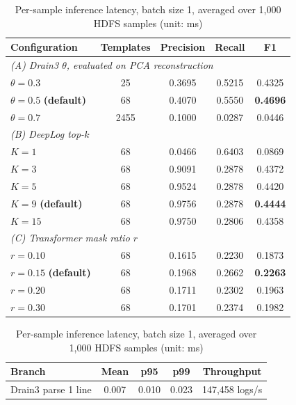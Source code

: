 \documentclass[conference]{IEEEtran}
\begin{document}
\begin{table}[!t]
\begin{minipage}[t]{0.48\textwidth}
\centering
\caption{Hyperparameter ablation study on HDFS 200k (seed 42)}
\label{tab_ablation}
\scriptsize
\setlength{\tabcolsep}{3pt}
\begin{tabular}{lcccc}
\toprule
\textbf{Configuration} & \textbf{Templates} & \textbf{Precision} & \textbf{Recall} & \textbf{F1} \\
\midrule
\multicolumn{5}{l}{\textit{(A) Drain3 $\theta$, evaluated on PCA reconstruction}} \\
$\theta=0.3$ & 25 & 0.3695 & 0.5215 & 0.4325 \\
$\theta=0.5$ \textbf{(default)} & 68 & 0.4070 & 0.5550 & \textbf{0.4696} \\
$\theta=0.7$ & 2455 & 0.1000 & 0.0287 & 0.0446 \\
\midrule
\multicolumn{5}{l}{\textit{(B) DeepLog top-$k$}} \\
$K=1$ & 68 & 0.0466 & 0.6403 & 0.0869 \\
$K=3$ & 68 & 0.9091 & 0.2878 & 0.4372 \\
$K=5$ & 68 & 0.9524 & 0.2878 & 0.4420 \\
$K=9$ \textbf{(default)} & 68 & 0.9756 & 0.2878 & \textbf{0.4444} \\
$K=15$ & 68 & 0.9750 & 0.2806 & 0.4358 \\
\midrule
\multicolumn{5}{l}{\textit{(C) Transformer mask ratio $r$}} \\
$r=0.10$ & 68 & 0.1615 & 0.2230 & 0.1873 \\
$r=0.15$ \textbf{(default)} & 68 & 0.1968 & 0.2662 & \textbf{0.2263} \\
$r=0.20$ & 68 & 0.1711 & 0.2302 & 0.1963 \\
$r=0.30$ & 68 & 0.1701 & 0.2374 & 0.1982 \\
\bottomrule
\end{tabular}
\end{minipage}
\hfill
\begin{minipage}[t]{0.48\textwidth}
\centering
\caption{Per-sample inference latency, batch size 1, averaged over 1,000 HDFS samples (unit: ms)}
\label{tab_latency}
\scriptsize
\setlength{\tabcolsep}{3pt}
\begin{tabular}{lcccc}
\toprule
\textbf{Branch} & \textbf{Mean} & \textbf{p95} & \textbf{p99} & \textbf{Throughput} \\
\midrule
Drain3 parse 1 line & 0.007 & 0.010 & 0.023 & 147,458 logs/s \\

\end{tabular}
\end{minipage}
\end{table}
\end{document}
